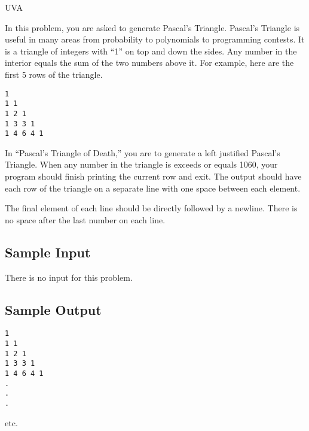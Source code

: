 

\noindent
UVA \bigskip

In this problem, you are asked to generate Pascal's Triangle. Pascal's Triangle is useful in many
areas from probability to polynomials to programming contests. It is a triangle of integers with
``1'' on top and down the sides. Any number in the interior equals the sum of the two numbers
above it. For example, here are the first 5 rows of the triangle.

\begin{verbatim}
1  
1 1  
1 2 1  
1 3 3 1  
1 4 6 4 1
\end{verbatim}

In ``Pascal's Triangle of Death,'' you are to generate a left justified Pascal's Triangle. When any
number in the triangle is exceeds or equals 1060, your program should finish printing the
current row and exit. The output should have each row of the triangle on a separate line with one
space between each element.

The final element of each line should be directly followed by a
newline. There is no space after the last number on each line.

\subsection*{Sample Input}

There is no input for this problem.

\subsection*{Sample Output}

\begin{verbatim}
1
1 1
1 2 1
1 3 3 1
1 4 6 4 1
.
.
.
\end{verbatim}

etc.
